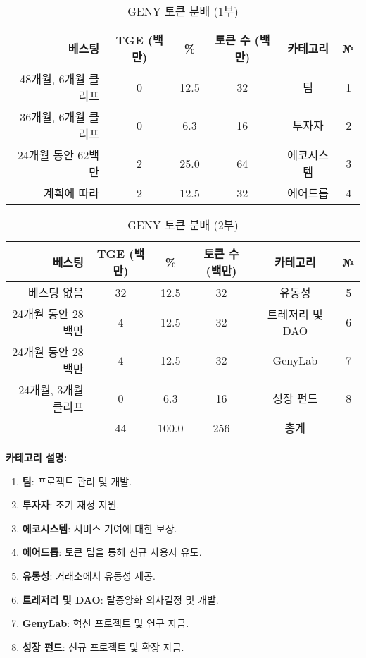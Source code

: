 \documentclass[a4paper,12pt,openany]{book}
\begin{document}
\begin{table}[h]
\centering
\caption{GENY 토큰 분배 (1부)}
\small
\begin{tabular}{r c c c c c}
\hline
\textbf{베스팅} & \textbf{TGE (백만)} & \textbf{\%} & \textbf{토큰 수 (백만)} & \textbf{카테고리} & \textbf{№} \\
\hline
48개월, 6개월 클리프 & 0 & 12.5 & 32 & 팀 & 1 \\
36개월, 6개월 클리프 & 0 & 6.3 & 16 & 투자자 & 2 \\
24개월 동안 62백만 & 2 & 25.0 & 64 & 에코시스템 & 3 \\
계획에 따라 & 2 & 12.5 & 32 & 에어드롭 & 4 \\
\hline
\end{tabular}
\end{table}

\begin{table}[h]
\centering
\caption{GENY 토큰 분배 (2부)}
\small
\begin{tabular}{r c c c c c}
\hline
\textbf{베스팅} & \textbf{TGE (백만)} & \textbf{\%} & \textbf{토큰 수 (백만)} & \textbf{카테고리} & \textbf{№} \\
\hline
베스팅 없음 & 32 & 12.5 & 32 & 유동성 & 5 \\
24개월 동안 28백만 & 4 & 12.5 & 32 & 트레저리 및 DAO & 6 \\
24개월 동안 28백만 & 4 & 12.5 & 32 & GenyLab & 7 \\
24개월, 3개월 클리프 & 0 & 6.3 & 16 & 성장 펀드 & 8 \\
\hline
-- & 44 & 100.0 & 256 & 총계 & -- \\
\hline
\end{tabular}
\end{table}

\textbf{카테고리 설명:}
\begin{enumerate}
    \item \textbf{팀}: 프로젝트 관리 및 개발.
    \item \textbf{투자자}: 초기 재정 지원.
    \item \textbf{에코시스템}: 서비스 기여에 대한 보상.
    \item \textbf{에어드롭}: 토큰 팁을 통해 신규 사용자 유도.
    \item \textbf{유동성}: 거래소에서 유동성 제공.
    \item \textbf{트레저리 및 DAO}: 탈중앙화 의사결정 및 개발.
    \item \textbf{GenyLab}: 혁신 프로젝트 및 연구 자금.
    \item \textbf{성장 펀드}: 신규 프로젝트 및 확장 자금.
\end{enumerate}
\end{document}
